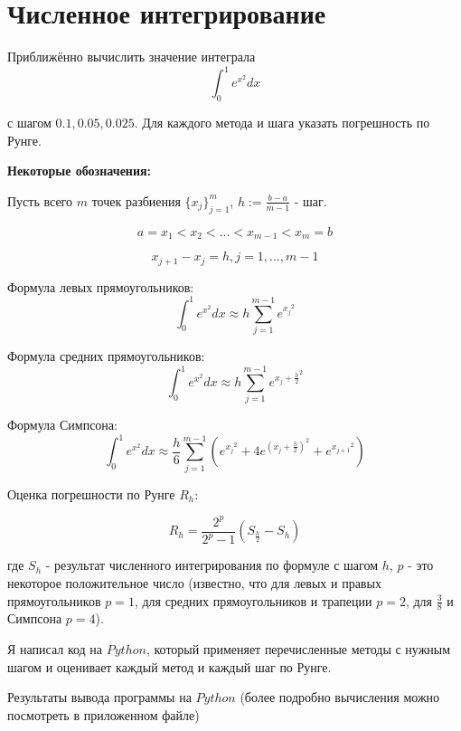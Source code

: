 \documentclass[a4paper]{article}
\author{Васильев Павел}
\begin{document}
\section*{Численное интегрирование}

Приближённо вычислить значение интеграла 
\[
\int_0^1 e^{x^2} dx
\]

с шагом $0.1, 0.05, 0.025$.
Для каждого метода и шага указать погрешность по Рунге.

\textbf{Некоторые обозначения:}

Пусть всего $m$ точек разбиения $\{ x_j \}_{j=1}^m$, $h:= \frac{b-a}{m-1}$ - шаг.

\[a = x_1 < x_2 < ... < x_{m-1} < x_m = b\]

\[x_{j+1} - x_j = h, j = 1, ..., m-1\]

Формула левых прямоугольников:
\[ \int_0^1 e^{x^2} dx \approx h \sum_{j=1}^{m-1} e^{{x_j}^2} \]

Формула средних прямоугольников:
\[ \int_0^1 e^{x^2} dx \approx  h \sum_{j=1}^{m-1} e^{{x_j + \frac{h}{2}}^2} \]

Формула Симпсона:
\[ \int_0^1 e^{x^2} dx \approx  \frac{h}{6} \sum_{j=1}^{m-1} \left( e^{{x_j}^2} + 4 e^{\left(x_j+\frac{h}{2}\right)^2} + e^{{x_{j+1}}^2} \right) \]

Оценка погрешности по Рунге $R_h$:

\[ R_h = \frac{2^p}{2^p-1} (S_{\frac{h}{2}} - S_h)\]

где $S_h$ - результат численного интегрирования по формуле с шагом $h$, $p$ - это некоторое положительное число (известно, что для левых и правых прямоугольников $p = 1$, для средних прямоугольников и трапеции $p = 2$, для $\frac{3}{8}$ и Симпсона $p=4$).



Я написал код на $Python$, который применяет перечисленные методы с нужным шагом и оценивает каждый метод и каждый шаг по Рунге.

Результаты вывода программы на $Python$ (более подробно вычисления можно посмотреть в приложенном файле)
\end{document}
